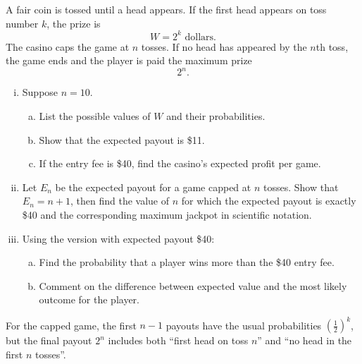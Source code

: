 \begin{problem}
A fair coin is tossed until a head appears. If the first head appears on toss number $k$, the prize is
\[
W=2^k \text{ dollars.}
\]
The casino caps the game at $n$ tosses. If no head has appeared by the $n$th toss, the game ends and the player is paid the maximum prize
\[
2^n.
\]

\begin{enumerate}[(i)]
  \item Suppose $n=10$.
  \begin{enumerate}[(a)]
    \item List the possible values of $W$ and their probabilities.
    \item Show that the expected payout is \$11.
    \item If the entry fee is \$40, find the casino's expected profit per game.
  \end{enumerate}
  \item Let $E_n$ be the expected payout for a game capped at $n$ tosses.
  Show that $E_n=n+1$, then find the value of $n$ for which the expected payout is exactly \$40 and the corresponding maximum jackpot in scientific notation.
  \item Using the version with expected payout \$40:
  \begin{enumerate}[(a)]
    \item Find the probability that a player wins more than the \$40 entry fee.
    \item Comment on the difference between expected value and the most likely outcome for the player.
  \end{enumerate}
\end{enumerate}
\end{problem}

\begin{hint}
For the capped game, the first $n-1$ payouts have the usual probabilities $\left(\frac12\right)^k$, but the final payout $2^n$ includes both ``first head on toss $n$'' and ``no head in the first $n$ tosses''.
\end{hint}

